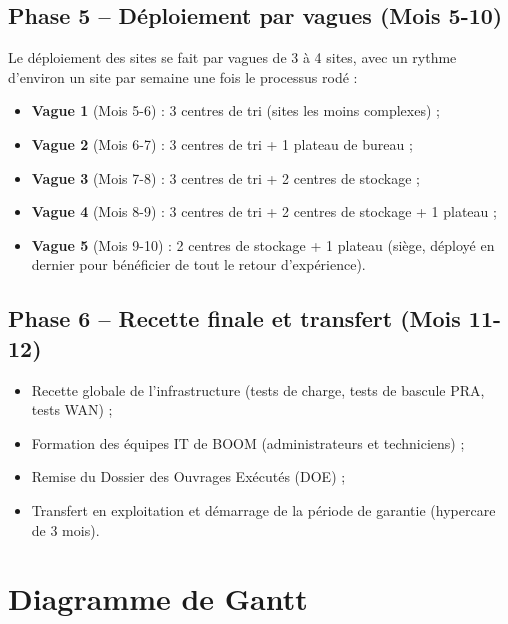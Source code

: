 \documentclass[12pt,a4paper]{report}
\begin{document}
\subsection{Phase 5 -- Déploiement par vagues (Mois 5-10)}

Le déploiement des sites se fait par vagues de 3 à 4 sites, avec un rythme d'environ un site par semaine une fois le processus rodé :

\begin{itemize}
\item \textbf{Vague 1} (Mois 5-6) : 3 centres de tri (sites les moins complexes) ;
\item \textbf{Vague 2} (Mois 6-7) : 3 centres de tri + 1 plateau de bureau ;
\item \textbf{Vague 3} (Mois 7-8) : 3 centres de tri + 2 centres de stockage ;
\item \textbf{Vague 4} (Mois 8-9) : 3 centres de tri + 2 centres de stockage + 1 plateau ;
\item \textbf{Vague 5} (Mois 9-10) : 2 centres de stockage + 1 plateau (siège, déployé en dernier pour bénéficier de tout le retour d'expérience).
\end{itemize}

\subsection{Phase 6 -- Recette finale et transfert (Mois 11-12)}

\begin{itemize}
\item Recette globale de l'infrastructure (tests de charge, tests de bascule PRA, tests WAN) ;
\item Formation des équipes IT de BOOM (administrateurs et techniciens) ;
\item Remise du Dossier des Ouvrages Exécutés (DOE) ;
\item Transfert en exploitation et démarrage de la période de garantie (hypercare de 3 mois).
\end{itemize}

\section{Diagramme de Gantt}
\end{document}
